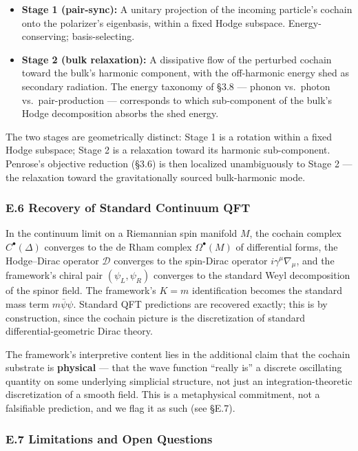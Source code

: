 \documentclass[
]{article}
\providecommand{\tightlist}{%
  \setlength{\itemsep}{0pt}\setlength{\parskip}{0pt}}
\begin{document}
\begin{itemize}
\tightlist
\item
  \textbf{Stage 1 (pair-sync):} A unitary projection of the incoming
  particle's cochain onto the polarizer's eigenbasis, within a fixed
  Hodge subspace. Energy-conserving; basis-selecting.
\item
  \textbf{Stage 2 (bulk relaxation):} A dissipative flow of the
  perturbed cochain toward the bulk's harmonic component, with the
  off-harmonic energy shed as secondary radiation. The energy taxonomy
  of §3.8 --- phonon vs.~photon vs.~pair-production --- corresponds to
  which sub-component of the bulk's Hodge decomposition absorbs the shed
  energy.
\end{itemize}

The two stages are geometrically distinct: Stage 1 is a rotation within
a fixed Hodge subspace; Stage 2 is a relaxation toward its harmonic
sub-component. Penrose's objective reduction (§3.6) is then localized
unambiguously to Stage 2 --- the relaxation toward the gravitationally
sourced bulk-harmonic mode.

\subsubsection{E.6 Recovery of Standard Continuum
QFT}\label{e.6-recovery-of-standard-continuum-qft}

In the continuum limit on a Riemannian spin manifold \(M\), the cochain
complex \(C^\bullet(\Delta)\) converges to the de Rham complex
\(\Omega^\bullet(M)\) of differential forms, the Hodge--Dirac operator
\(\mathcal{D}\) converges to the spin-Dirac operator
\(i\gamma^\mu \nabla_\mu\), and the framework's chiral pair
\((\psi_L, \psi_R)\) converges to the standard Weyl decomposition of the
spinor field. The framework's \(K = m\) identification becomes the
standard mass term \(m\bar\psi\psi\). Standard QFT predictions are
recovered exactly; this is by construction, since the cochain picture is
the discretization of standard differential-geometric Dirac theory.

The framework's interpretive content lies in the additional claim that
the cochain substrate is \textbf{physical} --- that the wave function
``really is'' a discrete oscillating quantity on some underlying
simplicial structure, not just an integration-theoretic discretization
of a smooth field. This is a metaphysical commitment, not a falsifiable
prediction, and we flag it as such (see §E.7).

\subsubsection{E.7 Limitations and Open
Questions}\label{e.7-limitations-and-open-questions}
\end{document}
